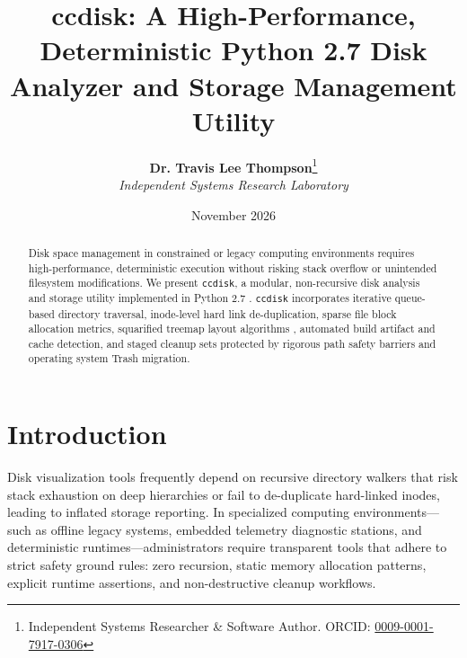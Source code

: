 \documentclass[11pt,article,a4paper]{article}
\title{\textbf{ccdisk: A High-Performance, Deterministic Python 2.7 Disk Analyzer and Storage Management Utility}}
\author{
  \textbf{Dr. Travis Lee Thompson}\thanks{Independent Systems Researcher \& Software Author. ORCID: \href{https://orcid.org/0009-0001-7917-0306}{0009-0001-7917-0306}} \\
  \textit{Independent Systems Research Laboratory}
}
\date{November 2026}
\begin{document}
\maketitle

\begin{abstract}
Disk space management in constrained or legacy computing environments requires high-performance, deterministic execution without risking stack overflow or unintended filesystem modifications. We present \texttt{ccdisk}, a modular, non-recursive disk analysis and storage utility implemented in Python 2.7 \cite{vesely2004python}. \texttt{ccdisk} incorporates iterative queue-based directory traversal, inode-level hard link de-duplication, sparse file block allocation metrics, squarified treemap layout algorithms \cite{bruls2000squarified, johnson1991treemaps}, automated build artifact and cache detection, and staged cleanup sets protected by rigorous path safety barriers and operating system Trash migration.
\end{abstract}

\section{Introduction}
Disk visualization tools frequently depend on recursive directory walkers that risk stack exhaustion on deep hierarchies or fail to de-duplicate hard-linked inodes, leading to inflated storage reporting. In specialized computing environments---such as offline legacy systems, embedded telemetry diagnostic stations, and deterministic runtimes---administrators require transparent tools that adhere to strict safety ground rules: zero recursion, static memory allocation patterns, explicit runtime assertions, and non-destructive cleanup workflows.
\end{document}
